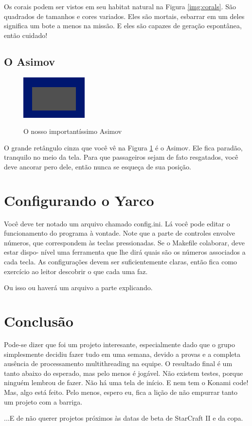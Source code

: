 \documentclass[10pt,brazil]{article}
\begin{document}
Os corais podem ser vistos em seu habitat natural na Figura \ref{img:corals}. São quadrados de tamanhos e cores variados.
Eles são mortais, esbarrar em um deles significa um bote a menos na missão. E eles são capazes de geração espontânea,
então cuidado!

\subsection{O Asimov}

\begin{figure}
\begin{center}
\includegraphics{ship}
\label{img:ship}
\caption{O nosso importantíssimo Asimov}
\end{center}
\end{figure}

O grande retângulo cinza que você vê na Figura \ref{img:ship} é o Asimov. Ele fica paradão, tranquilo no meio da tela.
Para que passageiros sejam de fato resgatados, você deve ancorar pero dele, então nunca se esqueça de sua posição.

\section{Configurando o Yarco}

Você deve ter notado um arquivo chamado config.ini. Lá você pode editar o funcionamento do programa à vontade. Note que
a parte de controles envolve números, que correspondem às teclas pressionadas. Se o Makefile colaborar, deve estar dispo-
nível uma ferramenta que lhe dirá quais são os números associados a cada tecla. As configurações devem ser suficientemente
claras, então fica como exercício ao leitor descobrir o que cada uma faz.

Ou isso ou haverá um arquivo a parte explicando.

\section{Conclusão}

Pode-se dizer que foi  um projeto interesante, especialmente dado que o grupo simplesmente decidiu fazer tudo
em uma semana, devido a provas e a completa ausência de processamento multithreading na equipe. O resultado final
 é um tanto abaixo do esperado, mas pelo menos é jogável. Não existem testes, porque ninguém lembrou de fazer.
 Não há uma tela de início. E nem tem o Konami code! Mas, algo está feito. Pelo menos, espero eu, fica a lição de
não empurrar tanto um projeto com a barriga.

...E de não querer projetos próximos às datas de beta de StarCraft II e da copa.
\end{document}
